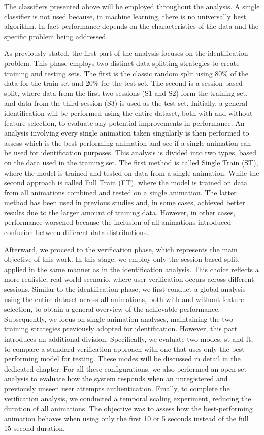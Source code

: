 \documentclass[12pt]{report}
\begin{document}
The classifiers presented above will be employed throughout the analysis. 
A single classifier is not used because, in machine learning, there is no universally best algorithm.
In fact performance depends on the characteristics of the data and the specific problem being addressed.

As previously stated, the first part of the analysis focuses on the identification problem. 
This phase employs two distinct data-splitting strategies to create training and testing sets. 
The first is the classic random split using 80\% of the data for the train set and 20\% for the test set.
The second is a session-based split, where data from the first two sessions (S1 and S2) form the training set, and data from the third session (S3) is used as the test set.
Initially, a general identification will be performed using the entire dataset, both with and without feature selection, to evaluate any potential improvements in performance.
An analysis involving every single animation taken singularly is then performed to assess which is the best-performing animation and see if a single animation can be used for identification purposes.
This analysis is divided into two types, based on the data used in the training set.
The first method is called Single Train (ST), where the model is trained and tested on data from a single animation.
While the second approach is called Full Train (FT), where the model is trained on data from all animations combined and tested on a single animation.
The latter method has been used in previous studies and, in some cases, achieved better results due to the larger amount of training data. 
However, in other cases, performance worsened because the inclusion of all animations introduced confusion between different data distributions.

Afterward, we proceed to the verification phase, which represents the main objective of this work.
In this stage, we employ only the session-based split, applied in the same manner as in the identification analysis.
This choice reflects a more realistic, real-world scenario, where user verification occurs across different sessions.
Similar to the identification phase, we first conduct a global analysis using the entire dataset across all animations, both with and without feature selection, to obtain a general overview of the achievable performance.
Subsequently, we focus on single-animation analyses, maintaining the two training strategies previously adopted for identification.
However, this part introduces an additional division.
Specifically, we evaluate two modes, st and ft, to compare a standard verification approach with one that uses only the best-performing model for testing. 
These modes will be discussed in detail in the dedicated chapter.
For all these configurations, we also performed an open-set analysis to evaluate how the system responds when an unregistered and previously unseen user attempts authentication.
Finally, to complete the verification analysis, we conducted a temporal scaling experiment, reducing the duration of all animations. 
The objective was to assess how the best-performing animation behaves when using only the first 10 or 5 seconds instead of the full 15-second duration.
\end{document}
